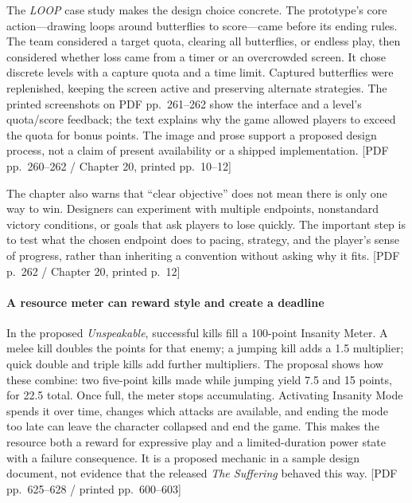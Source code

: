 The \emph{LOOP} case study makes the design choice concrete. The prototype's core action---drawing loops around butterflies to score---came before its ending rules. The team considered a target quota, clearing all butterflies, or endless play, then considered whether loss came from a timer or an overcrowded screen. It chose discrete levels with a capture quota and a time limit. Captured butterflies were replenished, keeping the screen active and preserving alternate strategies. The printed screenshots on PDF pp.~261--262 show the interface and a level's quota/score feedback; the text explains why the game allowed players to exceed the quota for bonus points. The image and prose support a proposed design process, not a claim of present availability or a shipped implementation. {[}PDF pp.~260--262 / Chapter 20, printed pp.~10--12{]}

The chapter also warns that ``clear objective'' does not mean there is only one way to win. Designers can experiment with multiple endpoints, nonstandard victory conditions, or goals that ask players to lose quickly. The important step is to test what the chosen endpoint does to pacing, strategy, and the player's sense of progress, rather than inheriting a convention without asking why it fits. {[}PDF p.~262 / Chapter 20, printed p.~12{]}

\paragraph{A resource meter can reward style and create a deadline}\label{05-engine-i-ch009-a-resource-meter-can-reward-style-and-create-a-deadline}

\hypertarget{05-engine-i-ch009-a-resource-meter-can-reward-style-and-create-a-deadline}{}

In the proposed \emph{Unspeakable}, successful kills fill a 100-point Insanity Meter. A melee kill doubles the points for that enemy; a jumping kill adds a 1.5 multiplier; quick double and triple kills add further multipliers. The proposal shows how these combine: two five-point kills made while jumping yield 7.5 and 15 points, for 22.5 total. Once full, the meter stops accumulating. Activating Insanity Mode spends it over time, changes which attacks are available, and ending the mode too late can leave the character collapsed and end the game. This makes the resource both a reward for expressive play and a limited-duration power state with a failure consequence. It is a proposed mechanic in a sample design document, not evidence that the released \emph{The Suffering} behaved this way. {[}PDF pp.~625--628 / printed pp.~600--603{]}

